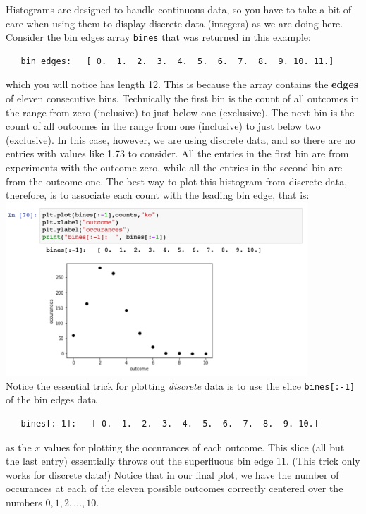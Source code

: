 Histograms are designed to handle continuous data, so you have to take a bit of care when using them to display discrete data (integers) as we are doing here.  Consider the bin edges array {\tt bines} that was returned in this example:
\begin{verbatim}
   bin edges:   [ 0.  1.  2.  3.  4.  5.  6.  7.  8.  9. 10. 11.]
\end{verbatim}
which you will notice has length 12.  This is because the
array contains the {\bf edges} of eleven consecutive bins.  Technically the first bin
is the count of all outcomes in the range from zero (inclusive) to
just below one (exclusive).  The next bin is the count of all outcomes
in the range from one (inclusive) to just below two (exclusive).  In
this case, however, we are using discrete data, and so there are no entries with values like 1.73 to consider.
All the entries in the first bin are from experiments with the outcome
zero, while all the entries in the second bin are from the outcome
one.  The best way to plot this histogram from discrete data, therefore, is
to associate each count with the leading bin edge, that is:\\
\includegraphics[width=0.85\textwidth]{figs/labs/distributions/plothist.png} \\
Notice the essential trick for plotting {\em discrete} data is to use the slice {\tt bines[:-1]} of the bin edges data
\begin{verbatim}
   bines[:-1]:   [ 0.  1.  2.  3.  4.  5.  6.  7.  8.  9. 10.]
\end{verbatim}
as the $x$ values for plotting the occurances of each outcome.  This
slice (all but the last entry) essentially throws out the superfluous
bin edge 11.  (This trick only works for discrete data!)  Notice that
in our final plot, we have the number of occurances at each of the
eleven possible outcomes correctly centered over the numbers
$0,1,2,\ldots,10.$


